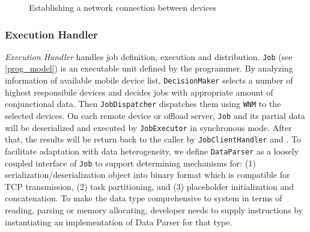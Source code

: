 \documentclass{sig-alternate}[10pt]
\begin{document}
\begin{figure} 
	\centering
	\caption{Establishing a network connection between devices}
	\label{fig:forming}
\end{figure}


\subsubsection{Execution Handler}
\emph{Execution Handler} handles job definition, execution and distribution. \texttt{Job} (see \ref{prog_model}) is an executable unit defined by the programmer. By analyzing information of available mobile device list, \texttt{DecisionMaker} selects a number of highest responsibile devices and decides jobs with appropriate amount of conjunctional data. Then \texttt{JobDispatcher} dispatches them using \texttt{WNM} to the selected devices. On each remote device or offload server, \texttt{Job} and its partial data will be deserialized and executed by \texttt{JobExecutor} in synchronous mode. After that, the results will be return back to the caller by \texttt{JobClientHandler} and . To facilitate adaptation with data heterogeneity, we define \texttt{DataParser} as a loosely coupled interface of \texttt{Job} to support determining mechanisms for: (1) serialization/deserialization object into binary format which is compatible for TCP transmission, (2) task partitioning, and (3) placeholder initialization and concatenation. To make the data type comprehensive to system in terms of reading, parsing or memory allocating, developer needs to supply instructions by instantiating an implementation of Data Parser for that type. 
\end{document}
